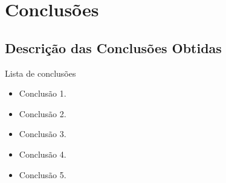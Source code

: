 \documentclass[%
  10pt,%
  aspectratio = 169,%
  compress,%
  t,%
  english,%
  brazilian,%
  tikz,
]{beamer}
\begin{document}

\section{Conclusões}\label{sec:concl}

\subsection{Descrição das Conclusões Obtidas}\label{ssec:concl1}

\begin{frame}
\begin{block}{Lista de conclusões}
\begin{itemize}
\item Conclusão 1.
\item Conclusão 2.
\item Conclusão 3.
\item Conclusão 4.
\item Conclusão 5.
\end{itemize}
\end{block}
\end{frame}
\end{document}
